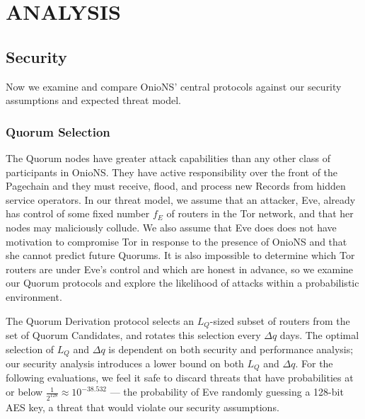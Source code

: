 
\chapter{ANALYSIS}
\label{ch:Analysis}

\section{Security}

Now we examine and compare OnioNS' central protocols against our security assumptions and expected threat model.



\subsection{Quorum Selection}

The Quorum nodes have greater attack capabilities than any other class of participants in OnioNS. They have active responsibility over the front of the Pagechain and they must receive, flood, and process new Records from hidden service operators. In our threat model, we assume that an attacker, Eve, already has control of some fixed number $ f_{E} $ of routers in the Tor network, and that her nodes may maliciously collude. We also assume that Eve does does not have motivation to compromise Tor in response to the presence of OnioNS and that she cannot predict future Quorums. It is also impossible to determine which Tor routers are under Eve's control and which are honest in advance, so we examine our Quorum protocols and explore the likelihood of attacks within a probabilistic environment.

The Quorum Derivation protocol selects an $ L_{Q} $-sized subset of routers from the set of Quorum Candidates, and rotates this selection every $ \Delta q $ days. The optimal selection of $ L_{Q} $ and $ \Delta q $ is dependent on both security and performance analysis; our security analysis introduces a lower bound on both $ L_{Q} $ and $ \Delta q $. For the following evaluations, we feel it safe to discard threats that have probabilities at or below $ \frac{1}{2^{128}} \approx 10^{-38.532} $ --- the probability of Eve randomly guessing a 128-bit AES key, a threat that would violate our security assumptions.

